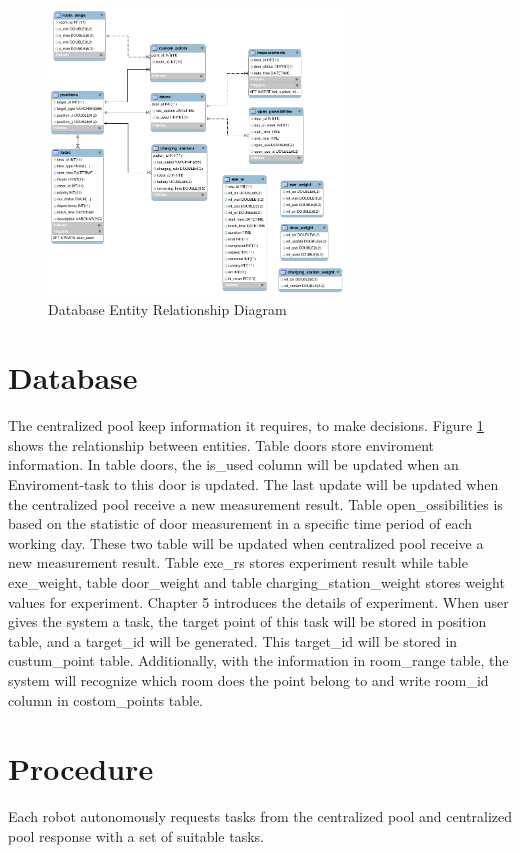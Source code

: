 \begin{figure}[htbp]
    \centering
    \includegraphics[width = 0.7\textwidth]{content/images/ch4/database_er.png}
    \caption{Database Entity Relationship Diagram}
    \label{fig:database_er}
\end{figure}


\section{Database}
The centralized pool keep information it requires, to make decisions. Figure \ref{fig:database_er} shows the relationship between entities. 
Table doors store enviroment information. In table doors, the is\_used column will be updated when an Enviroment-task to this door is updated. The last update will be updated when the centralized pool receive a new measurement result. 
Table open\_ossibilities is based on the statistic of door measurement in a specific time period of each working day. These two table will be updated when centralized pool receive a new measurement result. 
Table exe\_rs stores experiment result while table exe\_weight, table door\_weight and table charging\_station\_weight stores weight values for experiment. Chapter 5 introduces the details of experiment.
When user gives the system a task, the target point of this task will be stored in position table, and a target\_id will be generated.  This target\_id will be stored in custum\_point table. 
Additionally, with the information in room\_range table, the system will recognize which room does the point belong to and write room\_id column in costom\_points table.




\section{Procedure}
Each robot autonomously requests tasks from the centralized pool and centralized pool response with a set of suitable tasks. 
